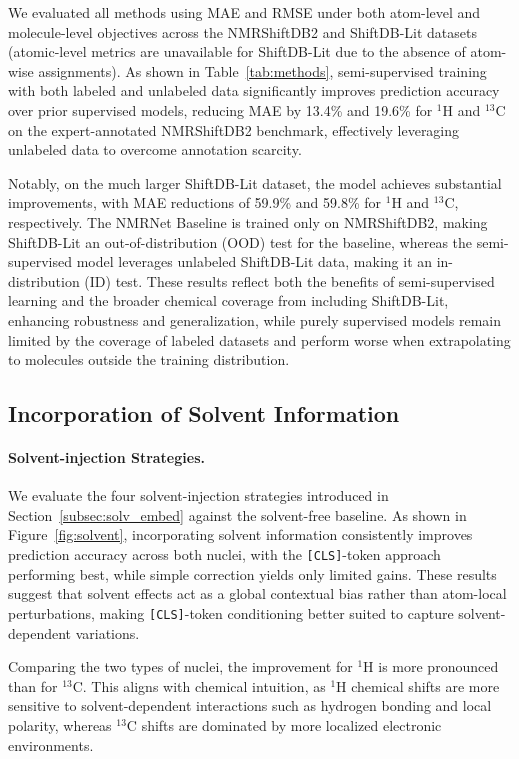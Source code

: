 We evaluated all methods using MAE and RMSE under both atom-level and molecule-level objectives across the NMRShiftDB2 and ShiftDB-Lit datasets
(atomic-level metrics are unavailable for ShiftDB-Lit due to the absence of atom-wise assignments).
As shown in Table~\ref{tab:methods}, semi-supervised training with both labeled and unlabeled data significantly improves prediction accuracy over prior supervised models, reducing MAE by 13.4\% and 19.6\% for \( ^1 \)H and \( ^{13} \)C on the expert-annotated NMRShiftDB2 benchmark, effectively leveraging unlabeled data to overcome annotation scarcity. 

Notably, on the much larger ShiftDB-Lit dataset, the model achieves substantial improvements, with MAE reductions of 59.9\% and 59.8\% for \( ^1 \)H and \( ^{13} \)C, respectively. 
The NMRNet Baseline is trained only on NMRShiftDB2, making ShiftDB-Lit an out-of-distribution (OOD) test for the baseline, whereas the semi-supervised model leverages unlabeled ShiftDB-Lit data, making it an in-distribution (ID) test.
These results reflect both the benefits of semi-supervised learning and the broader chemical coverage from including ShiftDB-Lit, enhancing robustness and generalization, while purely supervised models remain limited by the coverage of labeled datasets and perform worse when extrapolating to molecules outside the training distribution.


\subsection{Incorporation of Solvent Information}
\paragraph{Solvent-injection Strategies.}

We evaluate the four solvent-injection strategies introduced in Section~\ref{subsec:solv_embed} against the solvent-free baseline. 
As shown in Figure~\ref{fig:solvent}, incorporating solvent information consistently improves prediction accuracy across both nuclei, with the \texttt{[CLS]}-token approach performing best, while simple correction yields only limited gains. 
These results suggest that solvent effects act as a global contextual bias rather than atom-local perturbations, 
making \texttt{[CLS]}-token conditioning better suited to capture solvent-dependent variations.

Comparing the two types of nuclei, the improvement for \( ^1\)H is more pronounced than for \( ^{13}\)C. 
This aligns with chemical intuition, as \( ^1\)H chemical shifts are more sensitive to solvent-dependent interactions such as hydrogen bonding and local polarity, whereas \( ^{13}\)C shifts are dominated by more localized electronic environments.


